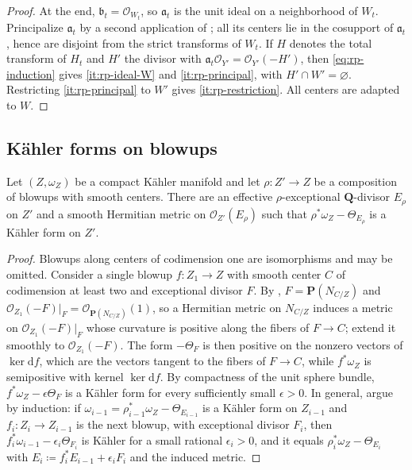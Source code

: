\documentclass[11pt,a4paper]{amsart}
\theoremstyle{definition}
\begin{document}
\begin{proof}
At the end, $\mathfrak b_t=\mathcal O_{W_t}$, so $\mathfrak a_t$ is the unit
ideal on a neighborhood of $W_t$. Principalize $\mathfrak a_t$ by a
second application of \cite[Theorem~1.3]{BM08}; all its centers lie in
the cosupport of $\mathfrak a_t$, hence are disjoint from the strict
transforms of $W_t$. If $H$ denotes the total transform of $H_t$ and
$H'$ the divisor with $\mathfrak a_t\mathcal O_{Y'}=\mathcal O_{Y'}(-H')$,
then \eqref{eq:rp-induction} gives \ref{it:rp-ideal-W} and
\ref{it:rp-principal}, with $H'\cap W'=\varnothing$. Restricting
\ref{it:rp-principal} to $W'$ gives \ref{it:rp-restriction}. All centers
are adapted to $W$.
\end{proof}

\subsection{K\"ahler forms on blowups}

\begin{lemma}\label{lem:exceptional-metric}
Let $(Z,\omega_Z)$ be a compact K\"ahler manifold and let
$\rho\colon Z'\to Z$ be a composition of blowups with smooth centers.
There are an effective $\rho$-exceptional $\mathbf Q$-divisor $E_\rho$
on $Z'$ and a smooth Hermitian metric on $\mathcal O_{Z'}(E_\rho)$ such that
$\rho^*\omega_Z-\Theta_{E_\rho}$ is a K\"ahler form on $Z'$.
\end{lemma}

\begin{proof}
Blowups along centers of codimension one are isomorphisms and may be
omitted. Consider a single blowup $f\colon Z_1\to Z$ with smooth center
$C$ of codimension at least two and exceptional divisor $F$. By
\cite[Chapter~VII, Proposition~12.4 and its proof]{DemCADG}, $F=\mathbf
P(N_{C/Z})$ and $\mathcal O_{Z_1}(-F)|_F=\mathcal O_{\mathbf P(N_{C/Z})}(1)$,
so a Hermitian metric on $N_{C/Z}$ induces a metric on
$\mathcal O_{Z_1}(-F)|_F$ whose curvature is positive along the fibers of
$F\to C$; extend it smoothly to $\mathcal O_{Z_1}(-F)$. The form
$-\Theta_F$ is then positive on the nonzero vectors of $\ker\mathrm df$,
which are the vectors tangent to the fibers of $F\to C$, while
$f^*\omega_Z$ is semipositive with kernel $\ker\mathrm df$. By compactness
of the unit sphere bundle, $f^*\omega_Z-\epsilon\Theta_F$ is a K\"ahler
form for every sufficiently small $\epsilon>0$. In general, argue by
induction: if $\omega_{i-1}=\rho_{i-1}^*\omega_Z-\Theta_{E_{i-1}}$ is a
K\"ahler form on $Z_{i-1}$ and $f_i\colon Z_i\to Z_{i-1}$ is the next
blowup, with exceptional divisor $F_i$, then
$f_i^*\omega_{i-1}-\epsilon_i\Theta_{F_i}$ is K\"ahler for a small rational
$\epsilon_i>0$, and it equals $\rho_i^*\omega_Z-\Theta_{E_i}$ with
$E_i\coloneqq f_i^*E_{i-1}+\epsilon_iF_i$ and the induced metric.
\end{proof}
\end{document}
